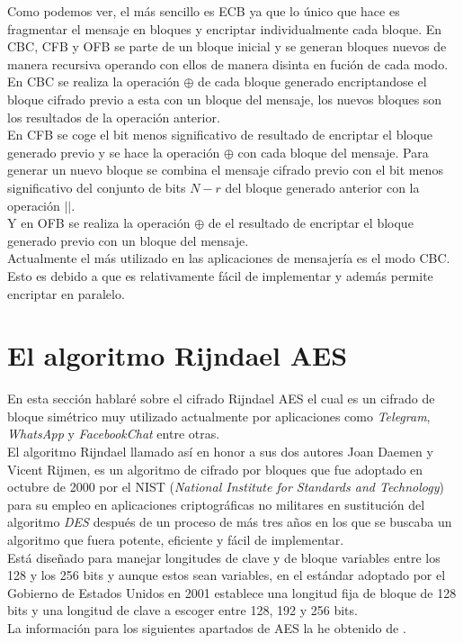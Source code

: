 \newpage
Como podemos ver, el más sencillo es ECB ya que lo único que hace es fragmentar el mensaje en bloques y encriptar individualmente cada bloque. En CBC, CFB y OFB se parte de un bloque inicial y se generan bloques nuevos de manera recursiva operando con ellos de manera disinta en fución de cada modo.\\ 
En CBC se realiza la operación $\oplus$ de cada bloque generado encriptandose el bloque cifrado previo a esta con un bloque del mensaje, los nuevos bloques son los resultados de la operación anterior.\\
En CFB se coge el bit menos significativo de resultado de encriptar el bloque generado previo y se hace la operación $\oplus$ con cada bloque del mensaje. Para generar un nuevo bloque se combina el mensaje cifrado previo con el bit menos significativo del conjunto de bits $N-r$ del bloque generado anterior con la operación $||$.\\
Y en OFB se realiza la operación $\oplus$ de el resultado de encriptar el bloque generado previo con un bloque del mensaje.\\
Actualmente el más utilizado en las aplicaciones de mensajería es el modo CBC. Esto es debido a que es relativamente fácil de implementar y además permite encriptar en paralelo.
\section{El algoritmo Rijndael AES}
En esta sección hablaré sobre el cifrado Rijndael AES el cual es un cifrado de bloque simétrico muy utilizado actualmente por aplicaciones como \emph{Telegram}, \emph{WhatsApp} y \emph{FacebookChat} entre otras.\\
El algoritmo Rijndael llamado así en honor a sus dos autores Joan Daemen y Vicent Rijmen, es un algoritmo de cifrado por bloques que fue adoptado en octubre de 2000 por el NIST (\emph{National Institute for Standards and Technology}) para su empleo en aplicaciones criptográficas no militares en sustitución del algoritmo \emph{DES} después de un proceso de más tres años en los que se buscaba un algoritmo que fuera potente, eficiente y fácil de implementar.\\
Está diseñado para manejar longitudes de clave y de bloque variables entre los 128 y los 256 bits y aunque estos sean variables, en el estándar adoptado por el Gobierno de Estados Unidos en 2001 \cite{aesUsa} establece una longitud fija de bloque de 128 bits y una longitud de clave a escoger entre 128, 192 y 256 bits.\\
La información para los siguientes apartados de AES la he obtenido de \cite{En2011}.\\

